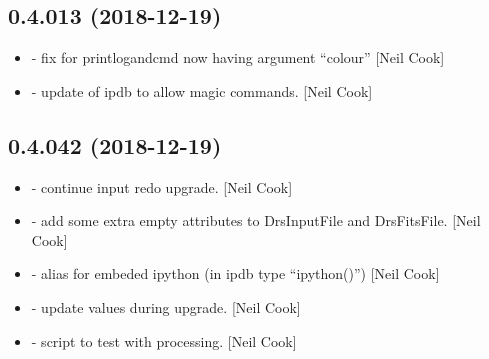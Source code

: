 \documentclass[a4paper,10pt,english]{report}
\begin{document}
\subsection{0.4.013 (2018-12-19)}
\label{\detokenize{misc/changelog:id225}}\begin{itemize}
\item {} 
 - fix for printlogandcmd now having argument “colour”
{[}Neil Cook{]}

\item {} 
 - update of ipdb to allow magic commands. {[}Neil Cook{]}

\end{itemize}


\subsection{0.4.042 (2018-12-19)}
\label{\detokenize{misc/changelog:id226}}\begin{itemize}
\item {} 
 - continue input redo upgrade. {[}Neil Cook{]}

\item {} 
 - add some extra empty attributes to DrsInputFile and
DrsFitsFile. {[}Neil Cook{]}

\item {} 
 - alias for embeded ipython (in ipdb type “ipython()”)
{[}Neil Cook{]}

\item {} 
 - update values during  upgrade. {[}Neil
Cook{]}

\item {} 
 - script to test  with processing. {[}Neil
Cook{]}

\end{itemize}
\end{document}
